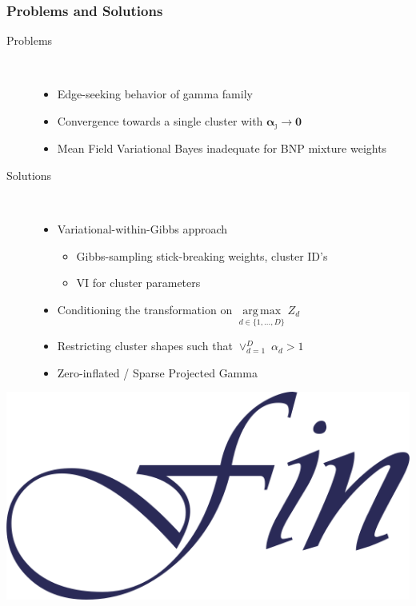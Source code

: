 \documentclass[aspectratio=169,10pt]{beamer}
\DeclareMathOperator*{\argmax}{arg\,max}
\newlength{\frametextheight}
\begin{document}
\begin{frame}
    \frametitle{Problems and Solutions}
    \begin{description}
        \item[Problems]~ 
            \begin{itemize}
                \item Edge-seeking behavior of gamma family
                \item Convergence towards a single cluster with $\bm{\alpha}_{\jmath} \to \bm{0}$
                \item Mean Field Variational Bayes inadequate for BNP mixture weights
            \end{itemize}
        \item[Solutions]~
            \begin{itemize}
                \item Variational-within-Gibbs approach \cite{Loaizamaya2022}
                \begin{itemize}
                    \item Gibbs-sampling stick-breaking weights, cluster ID's
                    \item VI for cluster parameters
                \end{itemize}
                \item Conditioning the transformation on 
                    $\argmax\limits_{d \in \lbrace 1,\ldots, D\rbrace} Z_d$
                \item Restricting cluster shapes such that $\vee_{d = 1}^D\; \alpha_d > 1$
                \item Zero-inflated / Sparse Projected Gamma
            \end{itemize}
    \end{description}
\end{frame}

\begin{frame}[plain]
    \begin{center}
        \includegraphics[height=0.7\frametextheight]{./ch1/images/fin}
    \end{center}
\end{frame} %
\end{document}
